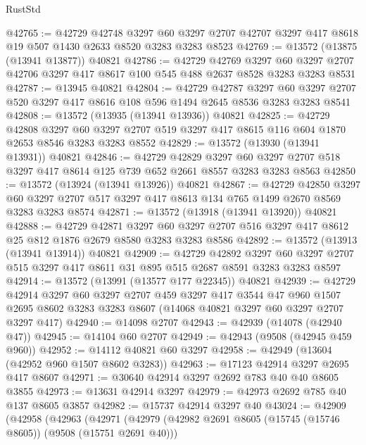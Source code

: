 \begin{lexlean}{RustStd}
\begin{coremodule}
@42765 := @42729
    @42748
    @3297
    @60
    @3297
    @2707
    @42707
    @3297
    @417
    @8618
    @19
    @507
    @1430
    @2633
    @8520
    @3283
    @3283
    @8523
@42769 := @13572 (@13875 (@13941 @13877)) @40821
@42786 := @42729
    @42769
    @3297
    @60
    @3297
    @2707
    @42706
    @3297
    @417
    @8617
    @100
    @545
    @488
    @2637
    @8528
    @3283
    @3283
    @8531
@42787 := @13945 @40821
@42804 := @42729
    @42787
    @3297
    @60
    @3297
    @2707
    @520
    @3297
    @417
    @8616
    @108
    @596
    @1494
    @2645
    @8536
    @3283
    @3283
    @8541
@42808 := @13572 (@13935 (@13941 @13936)) @40821
@42825 := @42729
    @42808
    @3297
    @60
    @3297
    @2707
    @519
    @3297
    @417
    @8615
    @116
    @604
    @1870
    @2653
    @8546
    @3283
    @3283
    @8552
@42829 := @13572 (@13930 (@13941 @13931)) @40821
@42846 := @42729
    @42829
    @3297
    @60
    @3297
    @2707
    @518
    @3297
    @417
    @8614
    @125
    @739
    @652
    @2661
    @8557
    @3283
    @3283
    @8563
@42850 := @13572 (@13924 (@13941 @13926)) @40821
@42867 := @42729
    @42850
    @3297
    @60
    @3297
    @2707
    @517
    @3297
    @417
    @8613
    @134
    @765
    @1499
    @2670
    @8569
    @3283
    @3283
    @8574
@42871 := @13572 (@13918 (@13941 @13920)) @40821
@42888 := @42729
    @42871
    @3297
    @60
    @3297
    @2707
    @516
    @3297
    @417
    @8612
    @25
    @812
    @1876
    @2679
    @8580
    @3283
    @3283
    @8586
@42892 := @13572 (@13913 (@13941 @13914)) @40821
@42909 := @42729
    @42892
    @3297
    @60
    @3297
    @2707
    @515
    @3297
    @417
    @8611
    @31
    @895
    @515
    @2687
    @8591
    @3283
    @3283
    @8597
@42914 := @13572 (@13991 (@13577 @177 @22345)) @40821
@42939 := @42729
    @42914
    @3297
    @60
    @3297
    @2707
    @459
    @3297
    @417
    @3544
    @47
    @960
    @1507
    @2695
    @8602
    @3283
    @3283
    @8607
    (@14068 @40821 @3297 @60 @3297 @2707 @3297 @417)
@42940 := @14098 @2707
@42943 := @42939 (@14078 (@42940 @47))
@42945 := @14104 @60 @2707
@42949 := @42943 (@9508 (@42945 @459 @960))
@42952 := @14112 @40821 @60 @3297
@42958 := @42949 (@13604 (@42952 @960 @1507 @8602 @3283))
@42963 := @17123 @42914 @3297 @2695 @417 @8607
@42971 := @30640 @42914 @3297 @2692 @783 @40 @40 @8605 @3855
@42973 := @13631 @42914 @3297
@42979 := @42973 @2692 @785 @40 @137 @8605 @3857
@42982 := @15737 @42914 @3297 @40
@43024 := @42909
    (@42958
      (@42963
        (@42971
          (@42979
            (@42982 @2691 @8605 (@15745 (@15746 @8605)) (@9508 (@15751 @2691 @40)))

\end{coremodule}
\end{lexlean}
